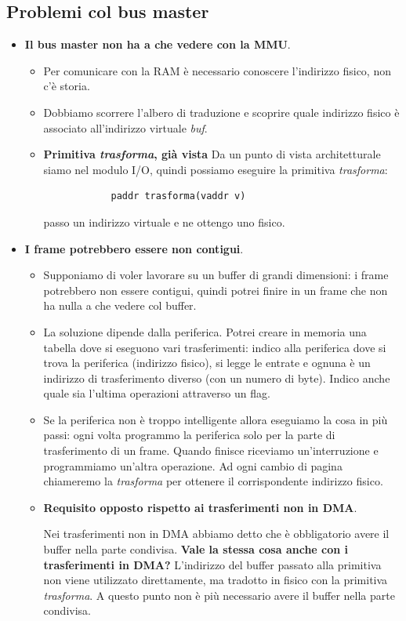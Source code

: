 \documentclass[11pt]{report}
\theoremstyle{definition}
\begin{document}
\subsection{Problemi col bus master}
\begin{itemize}
	\item \textbf{Il bus master non ha a che vedere con la MMU}.
	\begin{itemize}
		\item Per comunicare con la RAM è necessario conoscere l'indirizzo fisico, non c'è storia.
		\item Dobbiamo scorrere l'albero di traduzione e scoprire quale indirizzo fisico è associato all'indirizzo virtuale  \emph{buf}.
		\item \textbf{Primitiva \emph{trasforma}, già vista} Da un punto di vista architetturale siamo nel modulo I/O, quindi possiamo eseguire la primitiva \emph{trasforma}:
		\begin{verbatim}
			paddr trasforma(vaddr v)
		\end{verbatim}
		passo un indirizzo virtuale e ne ottengo uno fisico.
	\end{itemize} 
	\item \textbf{I frame potrebbero essere non contigui}.
	\begin{itemize}
		\item Supponiamo di voler lavorare su un buffer di grandi dimensioni: i frame potrebbero non essere contigui, quindi potrei finire in un frame che non ha nulla a che vedere col buffer.
		\item La soluzione dipende dalla periferica. Potrei creare in memoria una tabella dove si eseguono vari trasferimenti: indico alla periferica dove si trova la periferica (indirizzo fisico), si legge le entrate e ognuna è un indirizzo di trasferimento diverso (con un numero di byte). Indico anche quale sia l'ultima operazioni attraverso un flag. 
		\item Se la periferica non è troppo intelligente allora eseguiamo la cosa in più passi: ogni volta programmo la periferica solo per la parte di trasferimento di un frame. Quando finisce riceviamo un'interruzione e programmiamo un'altra operazione. Ad ogni cambio di pagina chiameremo la \emph{trasforma} per ottenere il corrispondente indirizzo fisico.
		\item \textbf{Requisito opposto rispetto ai trasferimenti non in DMA}.
		
		Nei trasferimenti non in DMA abbiamo detto che è obbligatorio avere il buffer nella parte condivisa. \textbf{Vale la stessa cosa anche con i trasferimenti in DMA?} L'indirizzo del buffer passato alla primitiva non viene utilizzato direttamente, ma tradotto in fisico con la primitiva \emph{trasforma}. A questo punto non è più necessario avere il buffer nella parte condivisa.
	\end{itemize}
\end{itemize}
\end{document}

